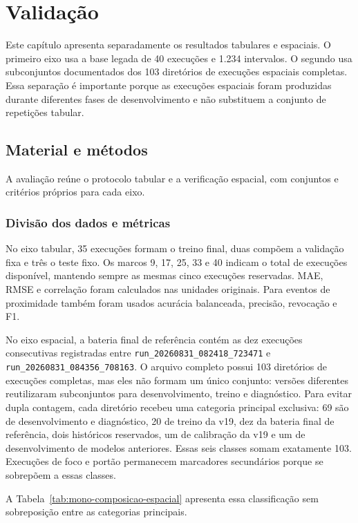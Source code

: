 \chapter{Validação}\label{cap:validacao}


Este capítulo apresenta separadamente os resultados tabulares e espaciais. O primeiro eixo usa a base legada de 40 execuções e 1.234 intervalos. O segundo usa subconjuntos documentados dos 103 diretórios de execuções espaciais completas. Essa separação é importante porque as execuções espaciais foram produzidas durante diferentes fases de desenvolvimento e não substituem a conjunto de repetições tabular.

\section{Material e métodos}

A avaliação reúne o protocolo tabular e a verificação espacial, com conjuntos e critérios próprios para cada eixo.

\subsection{Divisão dos dados e métricas}

No eixo tabular, 35 execuções formam o treino final, duas compõem a validação fixa e três o teste fixo. Os marcos 9, 17, 25, 33 e 40 indicam o total de execuções disponível, mantendo sempre as mesmas cinco execuções reservadas. MAE, RMSE e correlação foram calculados nas unidades originais. Para eventos de proximidade também foram usados acurácia balanceada, precisão, revocação e F1.

No eixo espacial, a bateria final de referência contém as dez execuções consecutivas registradas entre \texttt{run\_20260831\_082418\_723471} e \texttt{run\_20260831\_084356\_708163}. O arquivo completo possui 103 diretórios de execuções completas, mas eles não formam um único conjunto: versões diferentes reutilizaram subconjuntos para desenvolvimento, treino e diagnóstico. Para evitar dupla contagem, cada diretório recebeu uma categoria principal exclusiva: 69 são de desenvolvimento e diagnóstico, 20 de treino da v19, dez da bateria final de referência, dois históricos reservados, um de calibração da v19 e um de desenvolvimento de modelos anteriores. Essas seis classes somam exatamente 103. Execuções de foco e portão permanecem marcadores secundários porque se sobrepõem a essas classes.

A Tabela~\ref{tab:mono-composicao-espacial} apresenta essa classificação sem sobreposição entre as categorias principais.

